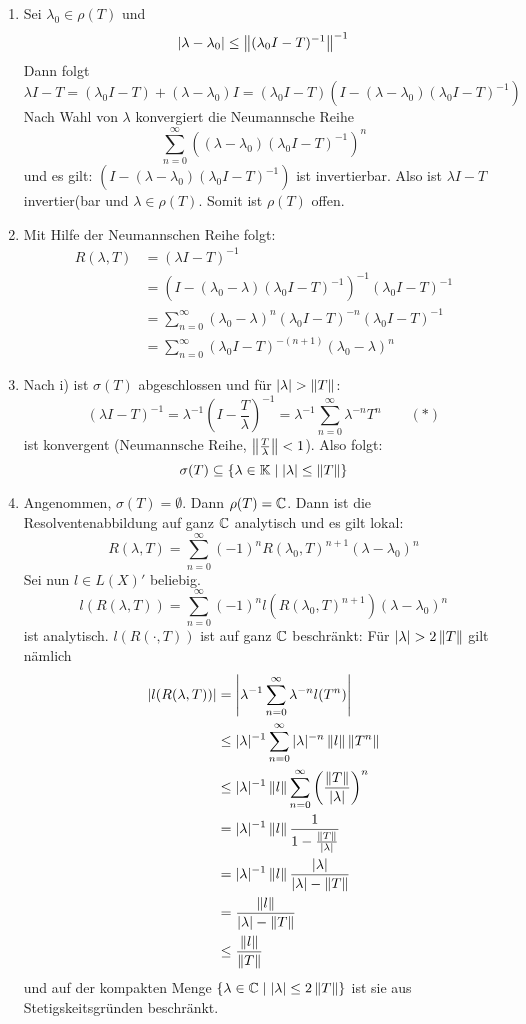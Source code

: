\begin{beweis}
	\begin{enumerate}
	\item Sei $ \lambda_0\in\rho(T) $ und \[ |\lambda-\lambda_0|\leq\left\|(\lambda_0 I-T)^{-1}\right\|^{-1} \]
	Dann folgt
	\[ \lambda I-T=(\lambda_0 I-T)+(\lambda-\lambda_0)I=(\lambda_0 I-T)(I-(\lambda-\lambda_0)(\lambda_0 I-T)^{-1}) \]
	Nach Wahl von $ \lambda $ konvergiert die Neumannsche Reihe
	\[ \sum_{n=0}^{\infty}((\lambda-\lambda_0)(\lambda_0 I-T)^{-1})^n \]
	und es gilt: $ (I-(\lambda-\lambda_0)(\lambda_0 I-T)^{-1}) $ ist invertierbar. Also ist $ \lambda I-T $ invertier(bar und $ \lambda\in\rho(T) $. Somit ist $ \rho(T) $ offen.
	\item Mit Hilfe der Neumannschen Reihe folgt:
	\begin{align*} R(\lambda,T)&=(\lambda I-T)^{-1}\\&=(I-(\lambda_0-\lambda)(\lambda_0 I-T)^{-1})^{-1}(\lambda_0 I-T)^{-1}\\&=\sum_{n=0}^{\infty}(\lambda_0-\lambda)^n(\lambda_0 I-T)^{-n}(\lambda_0 I-T)^{-1}\\&=\sum_{n=0}^{\infty}(\lambda_0 I-T)^{-(n+1)}(\lambda_0-\lambda)^n \end{align*}
	\item Nach i) ist $ \sigma(T) $ abgeschlossen und f\"ur $ |\lambda|>\norm{T} $:
	\[ (\lambda I-T)^{-1}=\lambda^{-1}\left(I-\frac{T}{\lambda}\right)^{-1}=\lambda^{-1}\sum_{n=0}^{\infty}\lambda^{-n}T^n\qquad(\ast) \]
	ist konvergent (Neumannsche Reihe, $ \left\|\frac{T}{\lambda}\right\|<1 $). Also folgt:
	\[ \sigma(T)\subseteq\lbrace\lambda\in\mathbb{K}\mid |\lambda|\leq\left\|T\right\|\rbrace \]
	\item Angenommen, $ \sigma(T)=\emptyset $. Dann $ \rho(T)=\mathbb{C} $. Dann ist die Resolventenabbildung auf ganz $ \mathbb{C} $ analytisch und es gilt lokal:
	\[ R(\lambda,T)=\sum_{n=0}^{\infty}(-1)^n R(\lambda_0,T)^{n+1}(\lambda-\lambda_0)^n \]
	Sei nun $ l\in L(X)' $ beliebig.
	\[ l(R(\lambda,T))=\sum_{n=0}^{\infty}(-1)^nl(R(\lambda_0,T)^{n+1})(\lambda-\lambda_0)^n \]
	ist analytisch. $ l(R(\cdot, T)) $ ist auf ganz $ \mathbb{C} $ beschr\"ankt: F\"ur $ |\lambda|>2\norm{T} $ gilt n\"amlich
	\begin{align*} |l(R(\lambda,T))|&=\left|\lambda^{-1}\sum_{n=0}^\infty\lambda^{-n} l(T^n)\right|\\&\leq|\lambda|^{-1}\sum_{n=0}^{\infty}|\lambda|^{-n}\left\|l\right\|\left\|T^n\right\|\\&\leq|\lambda|^{-1}\left\|l\right\|\sum_{n=0}^{\infty}\left(\frac{\left\|T\right\|}{|\lambda|}\right)^n\\&=|\lambda|^{-1}\left\|l\right\|\frac{1}{1-\frac{\left\|T\right\|}{|\lambda|}}\\&=|\lambda|^{-1}\left\|l\right\|\frac{|\lambda|}{|\lambda|-\left\|T\right\|}\\&=\frac{\left\|l\right\|}{|\lambda|-\left\|T\right\|}\\&\leq\frac{\left\|l\right\|}{\left\|T\right\|} \end{align*}
	und auf der kompakten Menge $ \lbrace \lambda\in\mathbb{C}\mid|\lambda|\leq2\left\|T\right\|\rbrace $ ist sie aus Stetigskeitsgr\"unden beschr\"ankt.

\end{enumerate}
\end{beweis}
